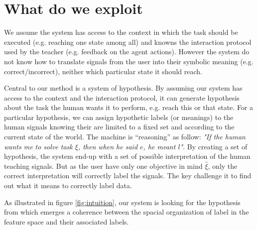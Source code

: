 \section{What do we exploit}

We assume the system has access to the context in which the task should be executed (e.g. reaching one state among all) and knowns the interaction protocol used by the teacher (e.g. feedback on the agent actions). However the system do not know how to translate signals from the user into their symbolic meaning (e.g. correct/incorrect), neither which particular state it should reach.

Central to our method is a system of hypothesis. By assuming our system has access to the context and the interaction protocol, it can generate hypothesis about the task the human wants it to perform, e.g. reach this or that state. For a particular hypothesis, we can assign hypothetic labels (or meanings) to the human signals knowing their are limited to a fixed set and according to the current state of the world. The machine is ``reasoning'' as follow: \emph{"If the human wants me to solve task $\xi$, then when he said $e$, he meant $l$"}. By creating a set of hypothesis, the system end-up with a set of possible interpretation of the human teaching signals. But as the user have only one objective in mind $\hat{\xi}$, only the correct interpretation will correctly label the signals. 
The key challenge it to find out what it means to correctly label data.

As illustrated in figure \ref{fig:intuition}, our system is looking for the hypothesis from which emerges a coherence between the spacial organization of label in the feature space and their associated labels.

